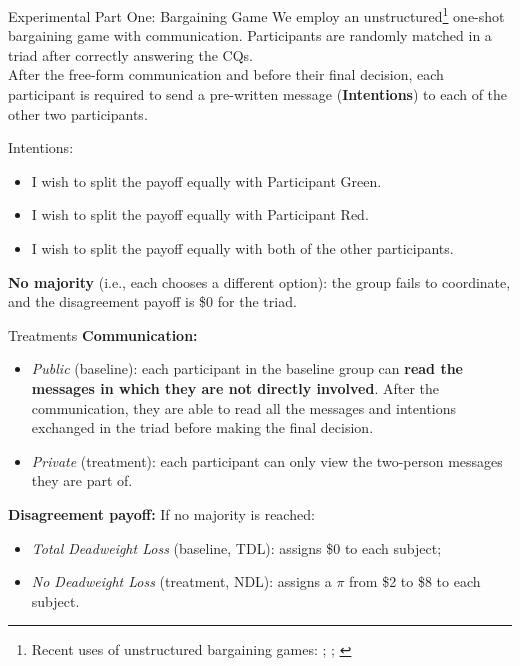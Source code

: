 \documentclass[aspectratio=169, xcolor=table]{beamer}
\begin{document}
\begin{frame}{Experimental Part One: Bargaining Game}\justifying
\renewcommand{\footnotesize}{\scriptsize} 
    We employ an unstructured\footnote{Recent uses of unstructured bargaining games: \cite{tremewan2018voting}; \cite{baranski2024experiment}; \cite{kamm2024commitment}} one-shot bargaining game with communication. Participants are randomly matched in a triad after correctly answering the CQs.\\
    \vspace{0.5\baselineskip}  
    After the free-form communication and before their final decision, each participant is required to send a pre-written message (\textbf{Intentions}) to each of the other two participants.
    
    \vspace{0.5\baselineskip}
    Intentions:
    \begin{itemize}
\item I wish to split the payoff equally with Participant Green.
\item I wish to split the payoff equally with Participant Red.
\item I wish to split the payoff equally with both of the other participants.
\end{itemize}
    \vspace{0.4\baselineskip}
    \textbf{No majority} (i.e., each chooses a different option): the group fails to coordinate, and the disagreement payoff is \$0 for the triad.
\end{frame}




\begin{frame}{Treatments}\justifying
\label{treatments}
\textbf{Communication:}
\begin{itemize}
    \item \textit{Public} (baseline): each participant in the baseline group can \textbf{read the messages in which they are not directly involved}. After the communication, they are able to read all the messages and intentions exchanged in the triad before making the final decision.
    \item \textit{Private} (treatment): each participant can only view the two-person messages they are part of.    
\end{itemize}
 
\vspace{0.5\baselineskip} 
\textbf{Disagreement payoff:}
 If no majority is reached:
\begin{itemize}
    \item \textit{Total Deadweight Loss} (baseline, TDL): assigns \$0 to each subject;
    \item \textit{No Deadweight Loss} (treatment, NDL): assigns a $\pi$ from \$2 to \$8 to each subject.
\end{itemize}
\end{frame}
\end{document}
